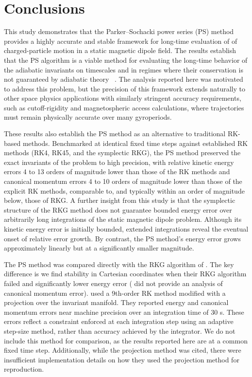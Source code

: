 \documentclass[draft]{agujournal2019}
\begin{document}
\section{Conclusions}\label{SEC:Conclusions}
This study demonstrates that the Parker--Sochacki power series (PS) method provides a highly accurate and stable framework for long-time evaluation of of charged-particle motion in a static magnetic dipole field. The results establish that the PS algorithm is a viable method for evaluating the long-time behavior of the adiabatic invariants on timescales and in regimes where their conservation is not guaranteed by adiabatic theory ~\cite{DragtFinn1976}. The analysis reported here was motivated to address this problem, but the precision of this framework extends naturally to other space physics applications with similarly stringent accuracy requirements, such as cutoff-rigidity and magnetospheric access calculations, where trajectories must remain physically accurate over many gyroperiods.

These results also establish the PS method as an alternative to traditional RK-based methods. Benchmarked at identical fixed time steps against established RK methods (RK4, RK45, and the symplectic RKG), the PS method preserved the exact invariants of the problem to high precision, with relative kinetic energy errors 4 to 13 orders of magnitude lower than those of the RK methods and canonical momentum errors 4 to 10 orders of magnitude lower than those of the explicit RK methods, comparable to, and typically within an order of magnitude below, those of RKG. A further insight from this study is that the symplectic structure of the RKG method does not guarantee bounded energy error over arbitrarily long integrations of the static magnetic dipole problem. Although its kinetic energy error is initially bounded, extended integrations reveal the eventual onset of relative error growth. By contrast, the PS method's energy error grows approximately linearly but at a significantly smaller magnitude. 

The PS method was compared directly with the RKG algorithm of . The key difference is we find stability in Cartesian coordinates when their RKG algorithm failed and significantly lower energy error ( did not provide an analysis of canonical momentum error).  used a 9th-order RK method modified with a projection over the invariant manifold. They reported energy and canonical momentum errors near machine precision over an integration time of 30 s. These errors reflect a constraint enforced at each integration step using an adaptive step-size method, rather than accuracy achieved by the integrator. We do not include this method for comparison, as the results reported here are at a common fixed time step. Additionally, while the projection method was cited, there were insufficient implementation details on how they used the projection method for reproduction.
\end{document}
